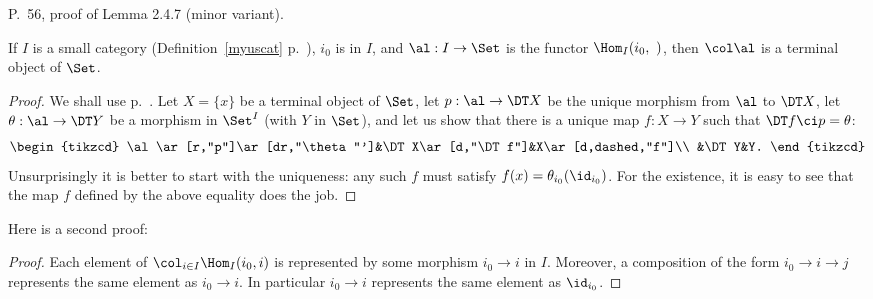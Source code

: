 \documentclass[12pt]{article}
\theoremstyle{remark}
\theoremstyle{definition}
\begin{document}



\begin{s} 
P.~56, proof of Lemma 2.4.7 (minor variant).

\begin{lem} 
If $I$ is a small category (Definition~\ref{myuscat} p.~), $i_0$ is in $I$, and $\al:I\to\Set$ is the functor $\Hom_I(i_0,\ )$, then $\col\al$ is a terminal object of $\Set$. 
\end{lem}

\begin{proof}
We shall use  p.~. Let $X=\{x\}$ be a terminal object of $\Set$, let $p:\al\to\DT X$ be the unique morphism from $\al$ to $\DT X$, let $\theta:\al\to\DT Y$ be a morphism in $\Set^I$ (with $Y$ in $\Set$), and let us show that there is a unique map $f:X\to Y$ such that $\DT f\ci p=\theta$: 
$$
\begin{tikzcd}
\al\ar[r,"p"]\ar[dr,"\theta"']&\DT X\ar[d,"\DT f"]&X\ar[d,dashed,"f"]\\ 
&\DT Y&Y.
\end{tikzcd}
$$ 
Unsurprisingly it is better to start with the uniqueness: any such $f$ must satisfy $f(x)=\theta_{i_0}(\id_{i_0})$. For the existence, it is easy to see that the map $f$ defined by the above equality does the job.
\end{proof}

Here is a second proof:

\begin{proof}
Each element of $\col_{i\in I}\Hom_I(i_0,i)$ is represented by some morphism $i_0\to i$ in $I$. Moreover, a composition of the form $i_0\to i\to j$ represents the same element as 
$i_0\to i$. In particular $i_0\to i$ represents the same element as $\id_{i_0}$. 
\end{proof}
\end{s}

%
\end{document}
